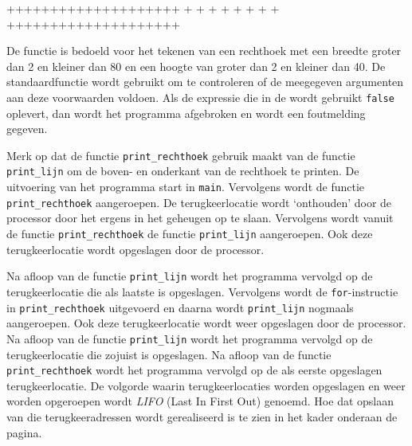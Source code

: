 \begin{dosbox}[title=Uitvoer van het programma in listing~\ref{cod:print_rechthoek}.,label=fig:print_rechthoek]
++++++++++++++++++++
+                  +
+                  +
+                  +
+                  +
++++++++++++++++++++
\end{dosbox}


De functie is bedoeld voor het tekenen van een rechthoek met een breedte groter dan 2 en kleiner dan 80 en een hoogte van groter dan 2 en kleiner dan 40. 
De standaardfunctie  wordt gebruikt om te controleren of de meegegeven argumenten aan deze voorwaarden voldoen.
Als de expressie die in de  wordt gebruikt \texttt{false} oplevert, dan wordt het programma afgebroken en wordt een foutmelding gegeven.

Merk op dat de functie \texttt{print\_rechthoek} gebruik maakt van de functie \texttt{print\_lijn} om de boven- en onderkant van de rechthoek te printen.
De uitvoering van het programma start in \texttt{main}.
Vervolgens wordt de functie \texttt{print\_rechthoek} aangeroepen.
De terugkeerlocatie wordt `onthouden' door de processor door het ergens in het geheugen op te slaan.
Vervolgens wordt vanuit de functie \texttt{print\_rechthoek} de functie \texttt{print\_lijn} aangeroepen. 
Ook deze terugkeerlocatie wordt opgeslagen door de processor.

Na afloop van de functie \texttt{print\_lijn} wordt het programma vervolgd op de terugkeerlocatie die als laatste is opgeslagen.
Vervolgens wordt de \texttt{for}-instructie in \texttt{print\_rechthoek} uitgevoerd en daarna wordt \texttt{print\_lijn} nogmaals aangeroepen.
Ook deze terugkeerlocatie wordt weer opgeslagen door de processor.
Na afloop van de functie \texttt{print\_lijn} wordt het programma vervolgd op de terugkeerlocatie die zojuist is opgeslagen.
Na afloop van de functie \texttt{print\_rechthoek} wordt het programma vervolgd op de als eerste opgeslagen terugkeerlocatie.
De volgorde waarin terugkeerlocaties worden opgeslagen en weer worden opgeroepen wordt \textsl{LIFO} (Last In First Out) genoemd.
Hoe dat opslaan van die terugkeeradressen wordt gerealiseerd is te zien in het kader onderaan de pagina.


